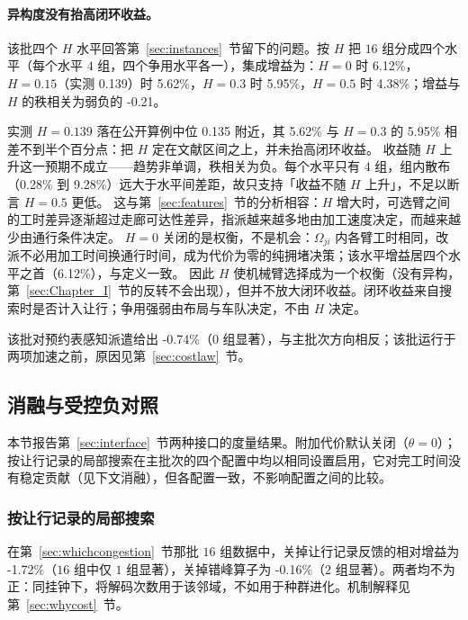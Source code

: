 \documentclass[manuscript,screen,review]{acmart}
\newcommand{\MatrixCells}{16}
\newcommand{\GainIntegMatrixLo}{0.28\%}
\newcommand{\GainIntegMatrixHi}{9.28\%}
\newcommand{\GainProbePre}{-0.74\%}      %
\newcommand{\GainCertMatrix}{-1.72\%}    %
\newcommand{\GainStaggerMatrix}{-0.16\%} %
\newcommand{\GainIntegHZero}{6.12\%}
\newcommand{\GainIntegHLow}{5.62\%}      %
\newcommand{\GainIntegHMid}{5.95\%}      %
\newcommand{\GainIntegHHigh}{4.38\%}     %
\newcommand{\MatrixHMeasLow}{0.139}      %
\newcommand{\RhoIntegH}{-0.21}           %
\newcommand{\PubHMed}{0.135}             %
\begin{document}
\paragraph{异构度没有抬高闭环收益。}
该批四个 $H$ 水平回答第~\ref{sec:instances}~节留下的问题。按 $H$ 把 $\MatrixCells$ 组分成四个水平（每个水平 $4$ 组，四个争用水平各一），集成增益为：$H=0$ 时 \GainIntegHZero{}，$H=0.15$（实测 \MatrixHMeasLow{}）时 \GainIntegHLow{}，$H=0.3$ 时 \GainIntegHMid{}，$H=0.5$ 时 \GainIntegHHigh{}；增益与 $H$ 的秩相关为弱负的 \RhoIntegH{}。

实测 $H=\MatrixHMeasLow$ 落在公开算例中位 \PubHMed{} 附近，其 \GainIntegHLow{} 与 $H=0.3$ 的 \GainIntegHMid{} 相差不到半个百分点：把 $H$ 定在文献区间之上，并未抬高闭环收益。
收益随 $H$ 上升这一预期不成立——趋势非单调，秩相关为负。每个水平只有 $4$ 组，组内散布（\GainIntegMatrixLo{} 到 \GainIntegMatrixHi{}）远大于水平间差距，故只支持「收益不随 $H$ 上升」，不足以断言 $H=0.5$ 更低。
这与第~\ref{sec:features}~节的分析相容：$H$ 增大时，可选臂之间的工时差异逐渐超过走廊可达性差异，指派越来越多地由加工速度决定，而越来越少由通行条件决定。
$H=0$ 关闭的是权衡，不是机会：$\Omega_{ji}$ 内各臂工时相同，改派不必用加工时间换通行时间，成为代价为零的纯拥堵决策；该水平增益居四个水平之首（\GainIntegHZero{}），与定义一致。
因此 $H$ 使机械臂选择成为一个权衡（没有异构，第~\ref{sec:Chapter_I}~节的反转不会出现），但并不放大闭环收益。闭环收益来自搜索时是否计入让行；争用强弱由布局与车队决定，不由 $H$ 决定。

该批对预约表感知派遣给出 \GainProbePre{}（$0$ 组显著），与主批次方向相反；该批运行于两项加速之前，原因见第~\ref{sec:costlaw}~节。

\subsection{消融与受控负对照}
\label{sec:pricing}

本节报告第~\ref{sec:interface}~节两种接口的度量结果。附加代价默认关闭（$\theta=0$）；按让行记录的局部搜索在主批次的四个配置中均以相同设置启用，它对完工时间没有稳定贡献（见下文消融），但各配置一致，不影响配置之间的比较。

\subsubsection{按让行记录的局部搜索}
在第~\ref{sec:whichcongestion}~节那批 $\MatrixCells$ 组数据中，关掉让行记录反馈的相对增益为 \GainCertMatrix{}（$\MatrixCells$ 组中仅 $1$ 组显著），关掉错峰算子为 \GainStaggerMatrix{}（$2$ 组显著）。两者均不为正：同挂钟下，将解码次数用于该邻域，不如用于种群进化。机制解释见第~\ref{sec:whycost}~节。
\end{document}
